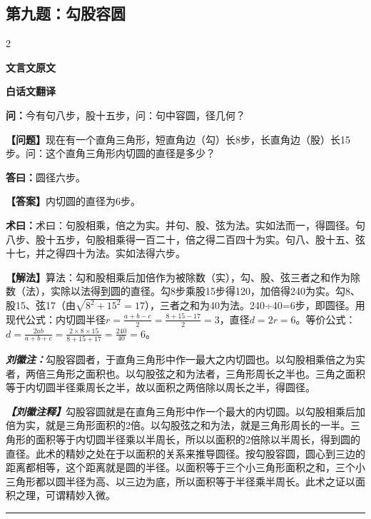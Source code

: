 \documentclass[10pt,a4paper]{article}
\newcommand{\wen}[1]{\textbf{\color{problemcolor}问：}#1\par}
\newcommand{\da}[1]{\textbf{答曰：}#1\par}
\newcommand{\shu}[1]{\textbf{术曰：}#1\par}
\newcommand{\liuhui}[1]{{\color{commentarycolor}\textit{\textbf{刘徽注：}}#1\par}}
\newcommand{\classicalheader}[1]{{\centering\large\bfseries\color{classicalcolor} #1\par\vspace{0.5em}}}
\newcommand{\wenmodern}[1]{\textbf{\color{moderncolor}【问题】}#1\par}
\newcommand{\damodern}[1]{\textbf{【答案】}#1\par}
\newcommand{\shumodern}[1]{\textbf{【解法】}#1\par}
\newcommand{\liuhuimodern}[1]{{\color{commentarycolor}\textit{\textbf{【刘徽注释】}}#1\par}}
\newcommand{\modernheader}[1]{{\centering\large\bfseries\color{moderncolor} #1\par\vspace{0.5em}}}
\newcommand{\problemsec}[1]{\subsection*{#1}}
\begin{document}
\problemsec{第九题：勾股容圆}
\begin{paracol}{2}
\classicalheader{文言文原文}
\switchcolumn
\modernheader{白话文翻译}
\switchcolumn*

\wen{今有句八步，股十五步，问：句中容圆，径几何？}

\switchcolumn

\wenmodern{现在有一个直角三角形，短直角边（勾）长8步，长直角边（股）长15步。问：这个直角三角形内切圆的直径是多少？}

\switchcolumn*

\da{圆径六步。}

\switchcolumn

\damodern{内切圆的直径为6步。}

\switchcolumn*

\shu{术曰：句股相乘，倍之为实。并句、股、弦为法。实如法而一，得圆径。句八步、股十五步，句股相乘得一百二十，倍之得二百四十为实。句八、股十五、弦十七，并之得四十为法。实如法得六步。}

\switchcolumn

\shumodern{算法：勾和股相乘后加倍作为被除数（实），勾、股、弦三者之和作为除数（法），实除以法得到圆的直径。勾8步乘股15步得120，加倍得240为实。勾8、股15、弦17（由$\sqrt{8^2+15^2}=17$），三者之和为40为法。240÷40=6步，即圆径。用现代公式：内切圆半径$r=\frac{a+b-c}{2}=\frac{8+15-17}{2}=3$，直径$d=2r=6$。等价公式：$d=\frac{2ab}{a+b+c}=\frac{2\times8\times15}{8+15+17}=\frac{240}{40}=6$。}

\switchcolumn*

\liuhui{勾股容圆者，于直角三角形中作一最大之内切圆也。以勾股相乘倍之为实者，两倍三角形之面积也。以勾股弦之和为法者，三角形周长之半也。三角之面积等于内切圆半径乘周长之半，故以面积之两倍除以周长之半，得圆径。}

\switchcolumn

\liuhuimodern{勾股容圆就是在直角三角形中作一个最大的内切圆。以勾股相乘后加倍为实，就是三角形面积的2倍。以勾股弦之和为法，就是三角形周长的一半。三角形的面积等于内切圆半径乘以半周长，所以以面积的2倍除以半周长，得到圆的直径。此术的精妙之处在于以面积的关系来推导圆径。按勾股容圆，圆心到三边的距离都相等，这个距离就是圆的半径。以面积等于三个小三角形面积之和，三个小三角形都以圆半径为高、以三边为底，所以面积等于半径乘半周长。此术之证以面积之理，可谓精妙入微。}

\end{paracol}

\vspace{0.3cm}
\hrule
\vspace{0.3cm}
\end{document}
